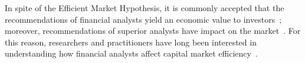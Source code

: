 \documentclass[a4paper,twoside,12pt,openright,notitlepage]{report}\usepackage[]{graphicx}\usepackage[]{color}
\begin{document}






In spite of the Efficient Market Hypothesis, it is commonly accepted that the recommendations of financial analysts yield an economic value to investors~\citep{womack1996}; moreover, recommendations of superior analysts have impact on the market~\citep{loh2011}. For this reason, researchers and practitioners have long been interested in understanding how financial analysts affect capital market efficiency~\citep{ramnath2008faf}.
\end{document}
